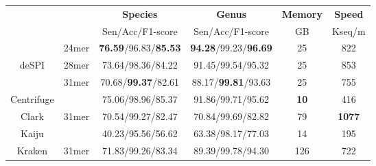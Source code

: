 \documentclass[a0,portrait]{a0poster}
\begin{document}
\begin{multicols}{2}
\begin{center}\vspace{1cm}
\small
\begin{tabular}{cccccc}
\toprule
& & \textbf{Species} & \textbf{Genus} & \textbf{Memory} & \textbf{Speed} \\
\cline{3-6}
& & Sen/Acc/F1-score & Sen/Acc/F1-score  & GB & Kseq/m \\
\midrule
& 24mer & \textbf{76.59}/96.83/\textbf{85.53} & \textbf{94.28}/99.23/\textbf{96.69} & 25 & 822 \\ 
deSPI & 28mer & 73.64/98.36/84.22 & 91.45/99.54/95.32 & 25 & 853 \\
& 31mer & 70.68/\textbf{99.37}/82.61 & 88.17/\textbf{99.81}/93.63 & 25 & 755 \\
Centrifuge & & 75.06/98.96/85.37 & 91.86/99.71/95.62 & \textbf{10} & 416 \\
Clark & 31mer & 70.54/99.27/82.47 & 70.84/99.69/82.82 & 79 & \textbf{1077} \\
Kaiju & & 40.23/95.56/56.62 & 63.38/98.17/77.03 & 14 & 195 \\
Kraken & 31mer & 71.83/99.26/83.34 & 89.39/99.78/94.30 & 126 & 722 \\
\bottomrule
\end{tabular}
\end{center}\vspace{1cm}


\end{multicols}
\end{document}
